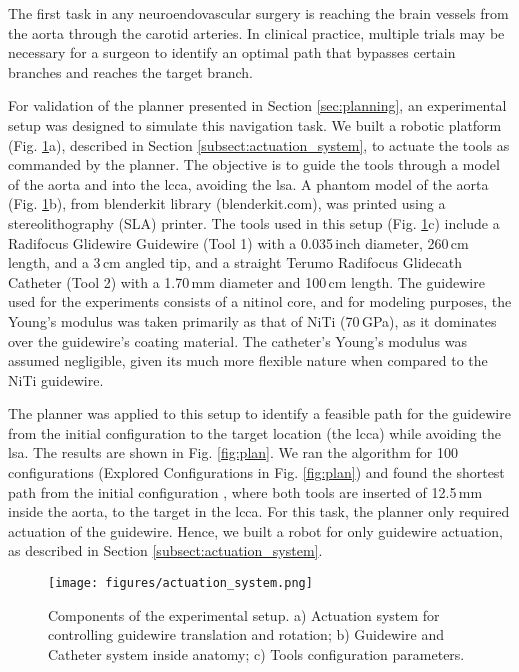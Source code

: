 The first task in any neuroendovascular surgery is reaching the brain vessels from the aorta through the carotid arteries. In clinical practice, multiple trials may be necessary for a surgeon to identify an optimal path that bypasses certain branches and reaches the target branch. 

For validation of the planner presented in Section \ref{sec:planning}, an experimental setup was designed to simulate this navigation task. We built a robotic platform (Fig. \ref{fig:actuation_system}a), described in Section \ref{subsect:actuation_system}, to actuate the tools as commanded by the planner. The objective is to guide the tools through a model of the aorta and into the \gls{lcca}, avoiding the \gls{lsa}. A phantom model of the aorta (Fig. \ref{fig:actuation_system}b), from blenderkit library (blenderkit.com), was printed using a stereolithography (SLA) printer. The tools used in this setup (Fig. \ref{fig:actuation_system}c) include a Radifocus Glidewire Guidewire (Tool 1) with a 0.035\,inch diameter, 260\,cm length, and a 3\,cm angled tip, and a straight Terumo Radifocus Glidecath Catheter (Tool 2) with a 1.70\,mm diameter and 100\,cm length. The guidewire used for the experiments consists of a nitinol core, and for modeling purposes, the Young's modulus was taken primarily as that of NiTi (70\,GPa), as it dominates over the guidewire’s coating material. The catheter's Young's modulus was assumed negligible, given its much more flexible nature when compared to the NiTi guidewire. 

The planner was applied to this setup to identify a feasible path for the guidewire from the initial configuration to the target location (the \gls{lcca}) while avoiding the \gls{lsa}. 
The results are shown in Fig. \ref{fig:plan}. We ran the algorithm for 100 configurations (Explored Configurations in Fig. \ref{fig:plan}) and found the shortest path from the initial configuration , where both tools are inserted of 12.5\,mm inside the aorta, to the target  in the \gls{lcca}. For this task, the planner only required actuation of the guidewire. Hence, we built a robot for only guidewire actuation, as described in Section \ref{subsect:actuation_system}.


\begin{figure}[t] 
    \centering
    \texttt{[image: figures/actuation\_system.png]}
    \caption{Components of the experimental setup. a) Actuation system for controlling guidewire translation and rotation; b) Guidewire and Catheter system inside anatomy; c) Tools configuration parameters.}
    \label{fig:actuation_system}
\end{figure}


